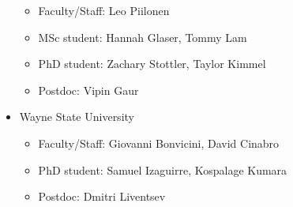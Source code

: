 \begin{itemize}
\begin{itemize}
\item Faculty/Staff:  Leo Piilonen
\item MSc student:  Hannah Glaser, Tommy Lam
\item PhD student:  Zachary Stottler, Taylor Kimmel
\item Postdoc:  Vipin  Gaur
\end{itemize}
\item Wayne State University
\begin{itemize}

\item Faculty/Staff:  Giovanni Bonvicini, David Cinabro
\item PhD student:  Samuel Izaguirre, Kospalage Kumara
\item Postdoc:  Dmitri Liventsev
\end{itemize}
\end{itemize}

